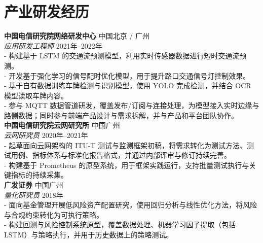 \section*{产业研发经历}

\noindent
\textbf{中国电信研究院网络研发中心} \hfill 中国北京 / 广州\\
\textit{应用研发工程师}
   \hfill 2021年--2022年 \\
- 构建基于 LSTM 的交通流预测模型，利用实时传感器数据进行短时交通流预测。\\
- 开发基于强化学习的信号配时优化模型，用于提升路口交通信号灯控制效果。\\
- 基于自有数据训练车牌检测与识别模型，使用 YOLO 完成检测，并结合 OCR 模型读取车牌内容。\\
- 参与 MQTT 数据管道研发，覆盖发布/订阅与连接处理，为模型接入实时边缘与路侧数据；同时参与前端产品设计与需求拆解，并与产品和平台团队协作。\\

\noindent
\textbf{中国电信研究院云网研究所} \hfill 中国广州\\
\textit{云网研究员}
   \hfill 2020年--2021年\\
- 起草面向云网架构的 ITU-T 测试与监测框架初稿，将需求转化为测试方法、测试用例、指标体系与标准化报告格式，并通过内部评审与修订持续完善。\\
- 构建基于 Prometheus 的原型系统，用于框架实践运行，支持批量测试执行与关键指标的持续采集。\\

\noindent
\textbf{广发证券} \hfill 中国广州\\
\textit{量化研究员}
   \hfill 2018年\\
- 面向基金管理开展低风险资产配置研究，使用回归分析与线性优化方法，将风险与合规约束转化为可执行策略。\\
- 构建回测与风险控制系统原型，覆盖数据处理、机器学习因子提取（包括 LSTM）与策略执行，并用于历史数据上的策略测试。
